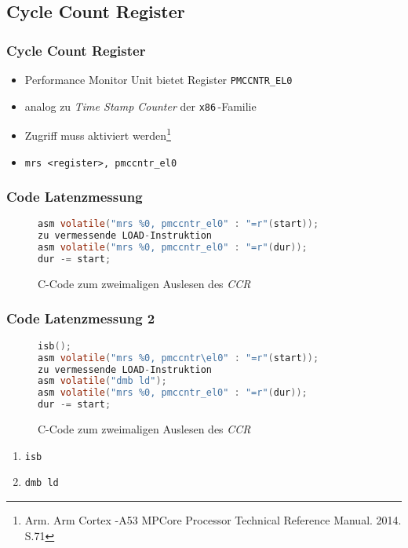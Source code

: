 \documentclass{beamer}
\begin{document}
\subsection{Cycle Count Register}
\begin{frame}
	\frametitle{Cycle Count Register}
	\begin{itemize}
		\item Performance Monitor Unit bietet Register \texttt{PMCCNTR\_EL0}
		\item analog zu \textit{Time Stamp Counter} der \texttt{x86}\,-Familie
		\item Zugriff muss aktiviert werden\footnote{\tiny Arm. Arm Cortex -A53 MPCore Processor Technical Reference Manual. 2014. S.71}
		\item \texttt{mrs <register>, pmccntr\_el0}
	\end{itemize}
\end{frame}

\begin{frame}[fragile]
\frametitle{Code Latenzmessung}
\begin{figure}
\centering
\begin{lstlisting}[language=C]
asm volatile("mrs %0, pmccntr_el0" : "=r"(start));
zu vermessende LOAD-Instruktion
asm volatile("mrs %0, pmccntr_el0" : "=r"(dur));
dur -= start;
\end{lstlisting}
\caption{C-Code zum zweimaligen Auslesen des \textsl{CCR}}
\end{figure}
\end{frame}

\begin{frame}[fragile]
\frametitle{Code Latenzmessung 2}
\begin{figure}
\begin{lstlisting}[language=C]
isb();
asm volatile("mrs %0, pmccntr\el0" : "=r"(start));
zu vermessende LOAD-Instruktion
asm volatile("dmb ld");
asm volatile("mrs %0, pmccntr_el0" : "=r"(dur));
dur -= start;
\end{lstlisting}
\caption{C-Code zum zweimaligen Auslesen des \textsl{CCR}}
\end{figure}


\begin{enumerate}
	\item \texttt{isb}
	\item \texttt{dmb ld}
\end{enumerate}

\end{frame}
\end{document}
